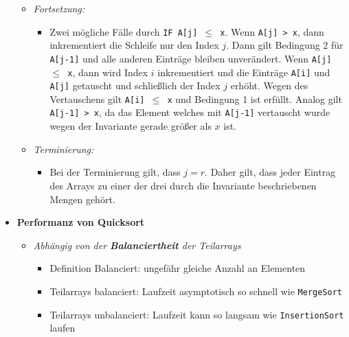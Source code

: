 \documentclass[
    12pt,
    a4paper,
    ngerman,
    color=3b,%
    marginpar=false,
    colorback=false,
    leqno,
]{tudaexercise}
\begin{document}
\begin{itemize}
\begin{itemize}
              \item \textit{Fortsetzung:}
                    \begin{itemize}
                        \item[]
                              Zwei mögliche Fälle durch \texttt{IF A[j] $\leq$ x}. Wenn \texttt{A[j] > x}, dann inkrementiert die
                              Schleife nur den Index $j$. Dann gilt Bedingung 2 für \texttt{A[j-1]} und alle anderen Einträge
                              bleiben unverändert. Wenn \texttt{A[j] $\leq$ x}, dann wird Index $i$ inkrementiert und die
                              Einträge \texttt{A[i]} und \texttt{A[j]} getauscht und schließlich der Index $j$ erhöht. Wegen
                              des Vertauschens gilt \texttt{A[i] $\leq$ x} und Bedingung 1 ist erfüllt. Analog gilt
                              \texttt{A[j-1] > x}, da das Element welches mit \texttt{A[j-1]} vertauscht wurde wegen der
                              Invariante gerade größer als $x$ ist.
                    \end{itemize}

              \item \textit{Terminierung:}
                    \begin{itemize}
                        \item[]
                              Bei der Terminierung gilt, dass $j = r$. Daher gilt, dass jeder Eintrag des Arrays zu einer der drei
                              durch die Invariante beschriebenen Mengen gehört.
                    \end{itemize}
          \end{itemize}

    \item \textbf{Performanz von Quicksort}
          \begin{itemize}
              \item \textit{Abhängig von der \textbf{Balanciertheit} der Teilarrays}
                    \begin{itemize}
                        \item Definition Balanciert: ungefähr gleiche Anzahl an Elementen
                        \item Teilarrays balanciert: Laufzeit asymptotisch so schnell wie \texttt{MergeSort}
                        \item Teilarrays unbalanciert: Laufzeit kann so langsam wie \texttt{InsertionSort} laufen
                    \end{itemize}


\end{itemize}
\end{itemize}
\end{document}
